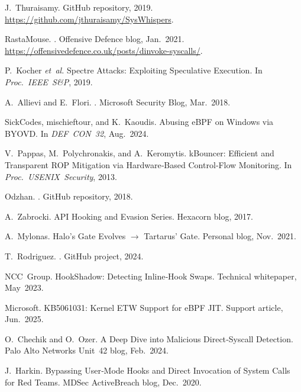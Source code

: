 \documentclass[11pt,letterpaper]{article}
\begin{document}
    
    \begin{thebibliography}{14}

    J.~Thuraisamy.
    \newblock GitHub repository, 2019.
    \newblock \url{https://github.com/jthuraisamy/SysWhispers}.

    RastaMouse.
    .
    \newblock Offensive Defence blog, Jan.\ 2021.
    \newblock \url{https://offensivedefence.co.uk/posts/dinvoke-syscalls/}.

    P.~Kocher \emph{et~al.}
    \newblock Spectre Attacks: Exploiting Speculative Execution.
    \newblock In {\em Proc.\ IEEE S\&P}, 2019.

    A.~Allievi and E.~Flori.
    .
    \newblock Microsoft Security Blog, Mar.\ 2018.

    SickCodes, mischieftour, and K.~Kaoudis.
    \newblock Abusing eBPF on Windows via BYOVD.
    \newblock In {\em DEF CON 32}, Aug.\ 2024.

    V.~Pappas, M.~Polychronakis, and A.~Keromytis.
    \newblock kBouncer: Efficient and Transparent ROP Mitigation via Hardware‑Based Control‑Flow Monitoring.
    \newblock In {\em Proc.\ USENIX Security}, 2013.

    Odzhan.
    .
    \newblock GitHub repository, 2018.

    A.~Zabrocki.
    \newblock API Hooking and Evasion Series.
    \newblock Hexacorn blog, 2017.

    A.~Mylonas.
    \newblock Halo's Gate Evolves $\rightarrow$ Tartarus' Gate.
    \newblock Personal blog, Nov.\ 2021.

    T.~Rodriguez.
    .
    \newblock GitHub project, 2024.

    NCC~Group.
    \newblock HookShadow: Detecting Inline‑Hook Swaps.
    \newblock Technical whitepaper, May 2023.

    Microsoft.
    \newblock KB5061031: Kernel ETW Support for eBPF JIT.
    \newblock Support article, Jun.\ 2025.

    O.~Chechik and O.~Ozer.
    \newblock A Deep Dive into Malicious Direct‑Syscall Detection.
    \newblock Palo Alto Networks Unit~42 blog, Feb.\ 2024.

    J.~Harkin.
    \newblock Bypassing User‑Mode Hooks and Direct Invocation of System Calls for Red Teams.
    \newblock MDSec ActiveBreach blog, Dec.\ 2020.

    \end{thebibliography}

    
\end{document}

